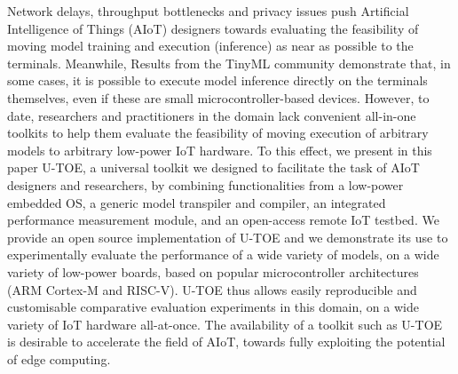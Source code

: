 Network delays, throughput bottlenecks and privacy issues push Artificial Intelligence of Things (AIoT) designers towards evaluating the feasibility of moving model training and execution (inference) as near as possible to the terminals. Meanwhile, 
Results from the TinyML community demonstrate that, in some cases, it is possible to execute model inference directly on the terminals themselves, even if these are small microcontroller-based devices. However, to date, researchers and practitioners in the domain lack convenient all-in-one toolkits to help them evaluate the feasibility of moving execution of arbitrary models to arbitrary low-power IoT hardware. To this effect, we present in this paper U-TOE, a universal toolkit we designed to facilitate the task of AIoT designers and researchers, by combining functionalities from a low-power embedded OS, a generic model transpiler and compiler, an integrated performance measurement module, and an open-access remote IoT testbed. We provide an open source implementation of U-TOE and we demonstrate its use to experimentally evaluate the performance of a wide variety of models, on a wide variety of low-power boards, based on popular microcontroller architectures (ARM Cortex-M and RISC-V). U-TOE thus allows easily reproducible and customisable comparative evaluation experiments in this domain, on a wide variety of IoT hardware all-at-once. The availability of a toolkit such as U-TOE is desirable to accelerate the field of AIoT, towards fully exploiting the potential of edge computing. 